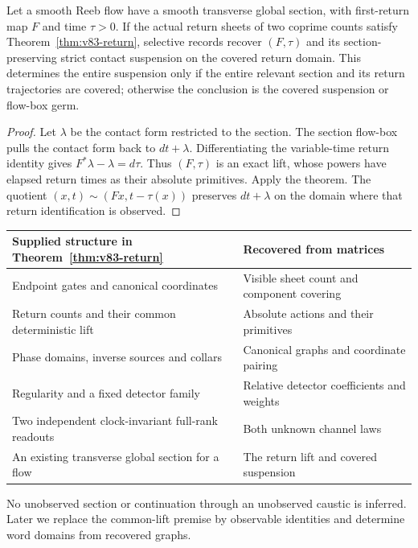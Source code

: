 \begin{corollary}
\label{cor:v83-contact}
Let a smooth Reeb flow have a smooth transverse global section, with
first-return map $F$ and time $\tau>0$. If the actual return sheets
of two coprime counts satisfy Theorem~\ref{thm:v83-return}, selective
records recover $(F,\tau)$ and its section-preserving strict contact
suspension on the covered return domain. This determines the entire
suspension only if the entire relevant section and its return
trajectories are covered; otherwise the conclusion is the covered
suspension or flow-box germ.
\end{corollary}
\begin{proof}
Let $\lambda$ be the contact form restricted to the section. The
section flow-box pulls the contact form back to $dt+\lambda$.
Differentiating the variable-time return identity gives
$F^*\lambda-\lambda=d\tau$. Thus $(F,\tau)$ is an exact lift,
whose powers have elapsed return times as their absolute primitives.
Apply the theorem. The quotient
$(x,t)\sim(Fx,t-\tau(x))$ preserves $dt+\lambda$ on the domain
where that return identification is observed.
\end{proof}

\begin{center}\small
\begin{tabular}{@{}p{}p{}@{}}
\toprule
Supplied structure in Theorem~\ref{thm:v83-return}&Recovered from matrices\\
\midrule
Endpoint gates and canonical coordinates&Visible sheet count and component covering\\
Return counts and their common deterministic lift&Absolute actions and their primitives\\
Phase domains, inverse sources and collars&Canonical graphs and coordinate pairing\\
Regularity and a fixed detector family&Relative detector coefficients and weights\\
Two independent clock-invariant full-rank readouts&Both unknown channel laws\\
An existing transverse global section for a flow&The return lift and covered suspension\\
\bottomrule
\end{tabular}\end{center}
No unobserved section or continuation through an unobserved caustic is
inferred. Later we replace the common-lift premise by observable
identities and determine word domains from recovered graphs.

